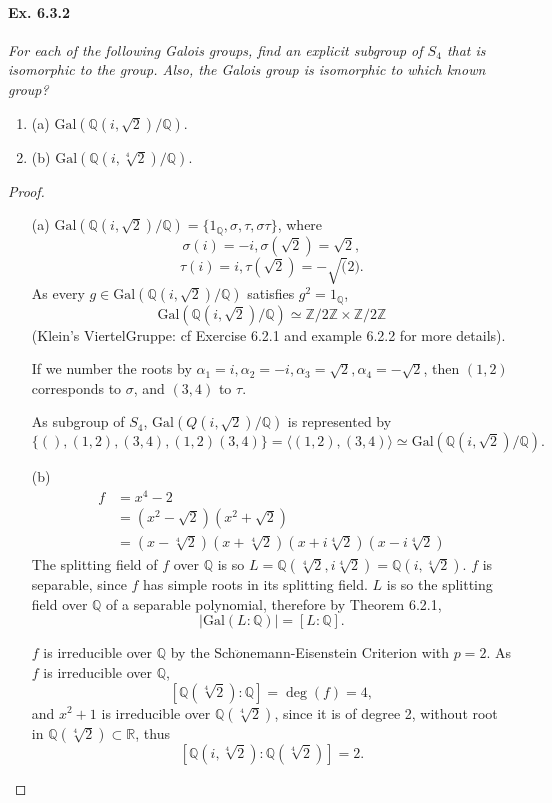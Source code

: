 \documentclass[11pt,a4paper]{article}
\newcommand{\be} {\begin{enumerate}}
\newcommand{\ee} {\end{enumerate}}
\newcommand{\Q}{\mathbb{Q}}
\newcommand{\Z}{\mathbb{Z}}
\newcommand{\R}{\mathbb{R}}
\newcommand{\Gal}{\mathrm{Gal}}
\begin{document}
\paragraph{Ex. 6.3.2}

{\it For each of the following Galois groups, find an explicit subgroup of $S_4$ that is isomorphic to the group. Also, the Galois group is isomorphic to which known group? 
\be
\item[(a)] $\Gal(\Q(i,\sqrt{2})/\Q)$.
\item[(b)] $\Gal(\Q(i,\sqrt[4]{2})/\Q)$.
\ee
}

\begin{proof}
\begin{enumerate}
\item[(a)]
$\Gal(\Q(i,\sqrt{2})/\Q) = \{1_{\Q}, \sigma, \tau, \sigma\tau\}$, where
$$\sigma(i) = -i, \sigma(\sqrt{2}) = \sqrt{2},$$
$$\tau(i) = i, \tau(\sqrt{2}) = -\sqrt(2).$$
As every  $g \in \Gal(\Q(i,\sqrt{2})/\Q)$  satisfies $g^2 = 1_{\Q}$, 
$$\Gal(\Q(i,\sqrt{2})/\Q) \simeq \Z/2\Z \times \Z/2\Z$$
(Klein's ViertelGruppe: cf Exercise 6.2.1 and example 6.2.2 for more details).

If we number the roots by $\alpha_1 = i, \alpha_2 = -i, \alpha_3 = \sqrt{2}, \alpha_4 = -\sqrt{2}$, then $(1,2)$ corresponds to $\sigma$, and $(3,4)$ to $\tau$.

As subgroup of $S_4$, $\Gal(Q(i,\sqrt{2})/\Q)$ is represented by $$\{ (), (1,2), (3,4), (1,2)(3,4)\} = \langle (1,2),(3,4) \rangle \simeq \Gal(\Q(i,\sqrt{2})/\Q).$$

\item[(b)]
 \begin{align*}
 f&=x^4-2\\
 &=(x^2-\sqrt{2})(x^2+\sqrt{2})\\
 &=(x-\sqrt[4]{2})(x+\sqrt[4]{2})(x+i\sqrt[4]{2})(x-i\sqrt[4]{2})
\end{align*}
The splitting field of $f$ over $\Q$ is so $L = \Q(\sqrt[4]{2},i\sqrt[4]{2}) = \Q(i,\sqrt[4]{2})$. $f$ is separable, since $f$ has simple roots in its splitting field. $L$ is so the splitting field over $\Q$ of a separable  polynomial, therefore by Theorem 6.2.1,$$\vert \Gal(L:\Q) \vert= [L:\Q].$$

$f$ is irreducible over $\Q$ by the Sch$\ddot o$nemann-Eisenstein Criterion with $p=2$.
As $f$ is irreducible over $\Q$, $$[\Q(\sqrt[4]{2}) : \Q] = \deg(f) = 4,$$ and $x^2+1$ is irreducible over $\Q(\sqrt[4]{2})$, since it is of degree 2, without root in $\Q(\sqrt[4]{2}) \subset \R$, thus $${[\Q(i,\sqrt[4]{2}) : \Q(\sqrt[4]{2})] = 2}.$$


\end{enumerate}
\end{proof}
\end{document}
